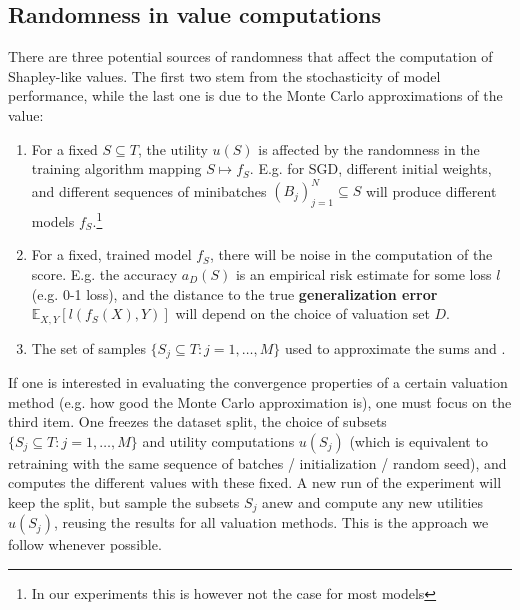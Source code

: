 \documentclass[10pt]{article}
\newcommand{\tmdfn}[1]{\textbf{#1}}
\begin{document}
\subsection{Randomness in value computations}\label{sec:sources-of-randomness}

There are three potential sources of randomness that affect the computation of
Shapley-like values. The first two stem from the stochasticity of model
performance, while the last one is due to the Monte Carlo approximations of
the value:
\begin{enumerate}
  \item For a fixed $S \subseteq T$, the utility $u (S)$ is affected by the
  randomness in the training algorithm mapping $S \mapsto f_S$. E.g. for SGD,
  different initial weights, and different sequences of minibatches $(B_j)_{j
  = 1}^N \subseteq S$ will produce different models $f_S$.\footnote{In our
  experiments this is however not the case for most models}
  
  \item For a fixed, trained model $f_S $, there will be noise in the
  computation of the score. E.g. the accuracy $a_D (S)$ is an empirical risk
  estimate for some loss $l$ (e.g. 0-1 loss), and the distance to the true
  {\tmdfn{generalization error}} $\mathbb{E}_{X, Y} [l (f_S (X), Y)]$ will
  depend on the choice of valuation set $D$.
  
  \item The set of samples $\{ S_j \subseteq T : j = 1, \ldots, M \}$ used to
  approximate the sums  and .
\end{enumerate}
If one is interested in evaluating the convergence properties of a certain
valuation method (e.g. how good the Monte Carlo approximation is), one must
focus on the third item. One freezes the dataset split, the choice of subsets
$\{ S_j \subseteq T : j = 1, \ldots, M \}$ and utility computations $u (S_j)$
(which is equivalent to retraining with the same sequence of batches /
initialization / random seed), and computes the different values with these
fixed. A new run of the experiment will keep the split, but sample the subsets
$S_j$ anew and compute any new utilities $u (S_j)$, reusing the results for
all valuation methods. This is the approach we follow whenever possible.
\end{document}
